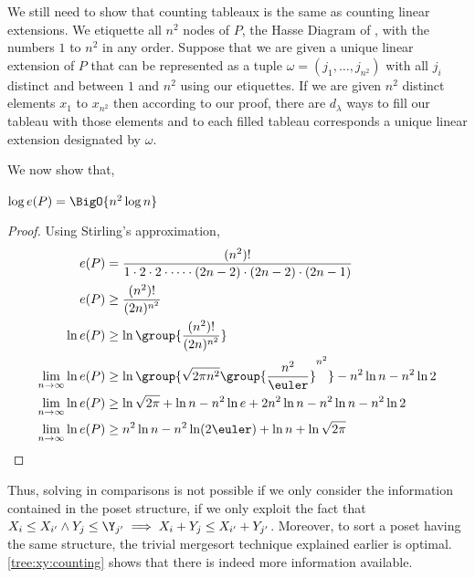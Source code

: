 We still need to show that counting tableaux is the same as counting linear
extensions. We etiquette all \( n^2 \) nodes of \(P\), the Hasse Diagram of
\XY, with the numbers \(1\) to \( n^2 \) in any order. Suppose that we are
given a unique linear extension of \(P\) that can be represented as a tuple
\( \omega = ( j_1 , \ldots , j_{n^2}) \)
with all \( j_i \) distinct and between \(1\) and \( n^2 \) using our
etiquettes. If we are given \( n^2 \) distinct elements \( x_1 \) to
\( x_{n^2} \) then according to our proof, there are \( d_{\lambda} \) ways to
fill our tableau with those elements and to each filled tableau corresponds a
unique linear extension designated by \(\omega\).


We now show that,

\begin{theorem}
\( \log e(P) = \BigO{n^2 \log n} \)
\end{theorem}

\begin{proof}
Using Stirling's approximation,
\begin{align}
e(P) &= \frac{(n^2)!}{1 \cdot 2 \cdot 2 \cdot \cdots \cdot (2n-2) \cdot (2n-2) \cdot (2n-1)}\\
e(P) &\ge \frac{(n^2)!}{(2n)^{n^2}}\\
\ln e(P) &\ge \ln \group{\frac{(n^2)!}{(2n)^{n^2}}}\\
\lim_{n \to \infty} \ln e(P) &\ge \ln{\group{\sqrt{2 \pi n^2}
\group{\frac{n^2}{\euler}}^{n^2}}}  - n^2 \ln n - n^2 \ln 2\\
\lim_{n \to \infty} \ln e(P) &\ge \ln{\sqrt{2\pi}} + \ln n - n^2 \ln e + 2 n^2
\ln n - n^2 \ln n - n^2 \ln 2\\
\lim_{n \to \infty} \ln e(P) &\ge n^2 \ln n - n^2 \ln (2\euler) + \ln n + \ln \sqrt{2\pi}
\end{align}
\end{proof}

Thus, solving \XY in  comparisons is not possible if we only
consider the information contained in the poset structure, \ie if we only
exploit the fact that \( X_i \le X_{i'} \land Y_j \le \Y_{j'} \implies X_i +
Y_j \le X_{i'} + Y_{j'}\). Moreover, to sort a poset having the same structure,
the trivial mergesort technique explained earlier is optimal.
\ref{tree:xy:counting} shows that there is indeed more information available.
